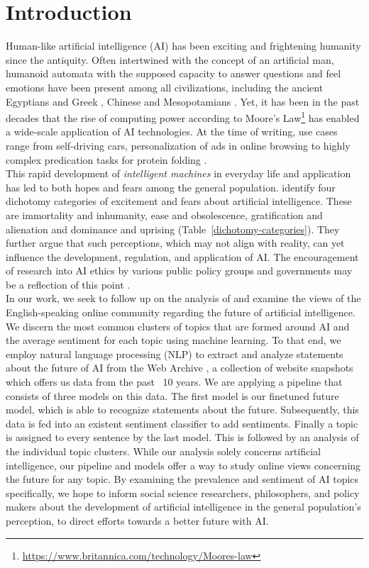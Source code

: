 \section{Introduction}

Human-like artificial intelligence (AI) has been exciting and frightening humanity since the antiquity.
Often intertwined with the concept of an artificial man, humanoid automata with the supposed capacity to answer questions and feel emotions have been present among all civilizations, including the ancient Egyptians and Greek \citep{Newquist1994}, Chinese \citep{cohen1986} and Mesopotamians \citep{unat2008}.
Yet, it has been in the past decades that the rise of computing power according to Moore’s Law\footnote{\url{https://www.britannica.com/technology/Moores-law}} has enabled a wide-scale application of AI technologies.
At the time of writing, use cases range from self-driving cars, personalization of ads in online browsing to highly complex predication tasks for protein folding \citep{jumper2021}.
\\
This rapid development of \emph{intelligent machines} in everyday life and application has led to both hopes and fears among the general population.
\citet{cave2019} identify four dichotomy categories of excitement and fears about artificial intelligence.
These are immortality and inhumanity, ease and obsolescence, gratification and alienation and dominance and uprising (Table~\ref{dichotomy-categories}).
They further argue that such perceptions, which may not align with reality, can yet influence the development, regulation, and application of AI.
The encouragement of research into AI ethics by various public policy groups and governments may be a reflection of this point \citep{leslie2019}.
\\
In our work, we seek to follow up on the analysis of \citet{cave2019} and examine the views of the English-speaking online community regarding the future of artificial intelligence. We discern the most common clusters of topics that are formed around AI and the average sentiment for each topic using machine learning. To that end, we employ natural language processing (NLP) to extract and analyze statements about the future of AI from the Web Archive \citep{Deckers2022}, a collection of website snapshots which offers us data from the past ~10 years.
We are applying a pipeline that consists of three models on this data.
The first model is our finetuned future model, which is able to recognize statements about the future.
Subsequently, this data is fed into an existent sentiment classifier  to add sentiments.
Finally a topic is assigned to every sentence by the last model.
This is followed by an analysis of the individual topic clusters.
While our analysis solely concerns artificial intelligence, our pipeline and models offer a way to study online views concerning the future for any topic. By examining the prevalence and sentiment of AI topics specifically, we hope to inform social science researchers, philosophers, and policy makers about the development of artificial intelligence in the general population’s perception, to direct efforts towards a better future with AI.

